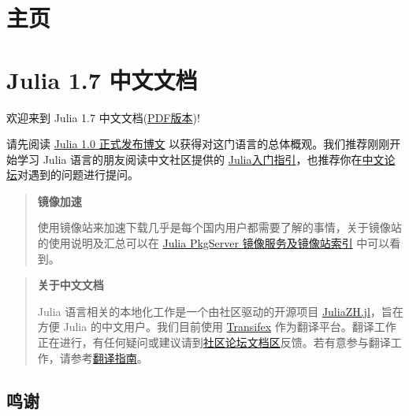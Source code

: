 
\part{主页}


\hypertarget{12848593357497183401}{}


\part{Julia 1.7 中文文档}



欢迎来到 Julia 1.7 中文文档(\href{https://docs.juliacn.com/pdf/dev/Julia中文文档.pdf}{PDF版本})!



请先阅读 \href{https://julialang.org/blog/2018/08/one-point-zero-zh\_cn}{Julia 1.0 正式发布博文} 以获得对这门语言的总体概观。我们推荐刚刚开始学习 Julia 语言的朋友阅读中文社区提供的 \href{https://discourse.juliacn.com/t/topic/159}{Julia入门指引}，也推荐你在\href{https://discourse.juliacn.com}{中文论坛}对遇到的问题进行提问。



\begin{quote}
\textbf{镜像加速}

使用镜像站来加速下载几乎是每个国内用户都需要了解的事情，关于镜像站的使用说明及汇总可以在 \href{https://discourse.juliacn.com/t/topic/2969}{Julia PkgServer 镜像服务及镜像站索引} 中可以看到。

\end{quote}


\begin{quote}
\textbf{关于中文文档}

Julia 语言相关的本地化工作是一个由社区驱动的开源项目 \href{https://github.com/JuliaCN/JuliaZH.jl}{JuliaZH.jl}，旨在方便 Julia 的中文用户。我们目前使用 \href{https://www.transifex.com}{Transifex} 作为翻译平台。翻译工作正在进行，有任何疑问或建议请到\href{https://discourse.juliacn.com/c/community/document}{社区论坛文档区}反馈。若有意参与翻译工作，请参考\href{https://discourse.juliacn.com/t/topic/277}{翻译指南}。

\end{quote}


\hypertarget{3438032608624046543}{}


\chapter{鸣谢}





